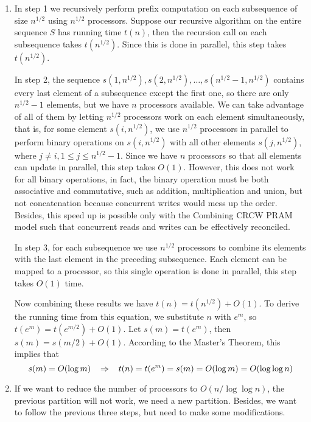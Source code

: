 \documentclass[11pt]{article}
\begin{document}
    \solution
    \begin{enumerate}[leftmargin=*, topsep=0pt]
      \item In step 1 we recursively perform prefix computation on each subsequence of size $n^{1/2}$ using $n^{1/2}$ processors. Suppose our recursive algorithm on the entire sequence $S$ has running time $t(n)$, then the recursion call on each subsequence takes $t(n^{1/2})$. Since this is done in parallel, this step takes $t(n^{1/2})$.

      In step 2, the sequence $s(1,n^{1/2}), s(2,n^{1/2}), \dots, s(n^{1/2}-1,n^{1/2})$ contains every last element of a subsequence except the first one, so there are only $n^{1/2}-1$ elements, but we have $n$ processors available. We can take advantage of all of them by letting $n^{1/2}$ processors work on each element simultaneously, that is, for some element $s(i,n^{1/2})$, we use $n^{1/2}$ processors in parallel to perform binary operations on $s(i,n^{1/2})$ with all other elements $s(j,n^{1/2})$, where $j \neq i, 1 \leq j \leq n^{1/2}-1$. Since we have $n$ processors so that all elements can update in parallel, this step takes $O(1)$. However, this does not work for all binary operations, in fact, the binary operation must be both associative and commutative, such as addition, multiplication and union, but not concatenation because concurrent writes would mess up the order. Besides, this speed up is possible only with the Combining CRCW PRAM model such that concurrent reads and writes can be effectively reconciled.

      In step 3, for each subsequence we use $n^{1/2}$ processors to combine its elements with the last element in the preceding subsequence. Each element can be mapped to a processor, so this single operation is done in parallel, this step takes $O(1)$ time.

      Now combining these results we have $t(n) = t(n^{1/2}) + O(1)$. To derive the running time from this equation, we substitute $n$ with $e^m$, so $t(e^m) = t(e^{m/2}) + O(1)$. Let $s(m) = t(e^m)$, then $s(m) = s(m/2) + O(1)$. According to the Master's Theorem, this implies that
      \begin{equation*}
        s(m) = O(\log m) \hspace{3mm} \Rightarrow \hspace{3mm} t(n) = t(e^m) = s(m) = O(\log m) = O(\log \log n)
      \end{equation*}

      \item If we want to reduce the number of processors to $O(n/\log \log n)$, the previous partition will not work, we need a new partition. Besides, we want to follow the previous three steps, but need to make some modifications.


\end{enumerate}
\end{document}
